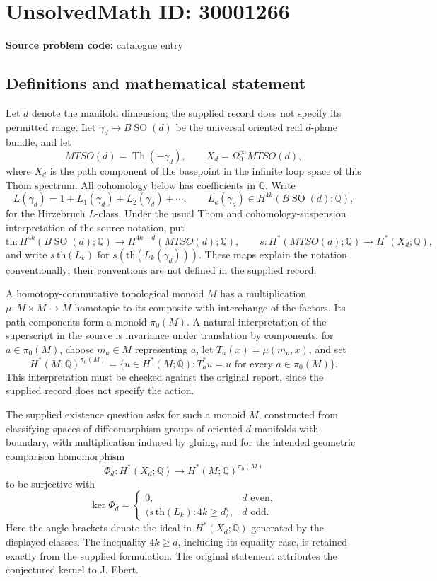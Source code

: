 \documentclass[11pt]{article}
\newcommand{\Q}{\mathbb{Q}}
\begin{document}
\section*{UnsolvedMath ID: 30001266}
\textbf{Source problem code:} catalogue entry
\subsection{Definitions and mathematical statement}
Let \(d\) denote the manifold dimension; the supplied record does not specify its permitted range. Let \(\gamma_d\to B\operatorname{SO}(d)\) be the universal oriented real \(d\)-plane bundle, and let
\[
MTSO(d)=\operatorname{Th}(-\gamma_d),\qquad X_d=\Omega^\infty_0MTSO(d),
\]
where \(X_d\) is the path component of the basepoint in the infinite loop space of this Thom spectrum. All cohomology below has coefficients in \(\Q\). Write
\[
L(\gamma_d)=1+L_1(\gamma_d)+L_2(\gamma_d)+\cdots,
\qquad L_k(\gamma_d)\in H^{4k}(B\operatorname{SO}(d);\Q),
\]
for the Hirzebruch \(L\)-class. Under the usual Thom and cohomology-suspension interpretation of the source notation, put
\[
\mathrm{th}:H^{4k}(B\operatorname{SO}(d);\Q)\longrightarrow H^{4k-d}(MTSO(d);\Q),
\qquad
s:H^*(MTSO(d);\Q)\longrightarrow H^*(X_d;\Q),
\]
and write \(s\,\mathrm{th}(L_k)\) for \(s(\mathrm{th}(L_k(\gamma_d)))\). These maps explain the notation conventionally; their conventions are not defined in the supplied record.

A homotopy-commutative topological monoid \(M\) has a multiplication \(\mu:M\times M\to M\) homotopic to its composite with interchange of the factors. Its path components form a monoid \(\pi_0(M)\). A natural interpretation of the superscript in the source is invariance under translation by components: for \(a\in\pi_0(M)\), choose \(m_a\in M\) representing \(a\), let \(T_a(x)=\mu(m_a,x)\), and set
\[
H^*(M;\Q)^{\pi_0(M)}
=\{u\in H^*(M;\Q):T_a^*u=u\text{ for every }a\in\pi_0(M)\}.
\]
This interpretation must be checked against the original report, since the supplied record does not specify the action.

The supplied existence question asks for such a monoid \(M\), constructed from classifying spaces of diffeomorphism groups of oriented \(d\)-manifolds with boundary, with multiplication induced by gluing, and for the intended geometric comparison homomorphism
\[
\Phi_d:H^*(X_d;\Q)\longrightarrow H^*(M;\Q)^{\pi_0(M)}
\]
to be surjective with
\[
\ker\Phi_d=
\begin{cases}
0,&d\text{ even},\\[2pt]
\bigl\langle s\,\mathrm{th}(L_k):4k\ge d\bigr\rangle,&d\text{ odd}.
\end{cases}
\]
Here the angle brackets denote the ideal in \(H^*(X_d;\Q)\) generated by the displayed classes. The inequality \(4k\ge d\), including its equality case, is retained exactly from the supplied formulation. The original statement attributes the conjectured kernel to J. Ebert.
\end{document}
